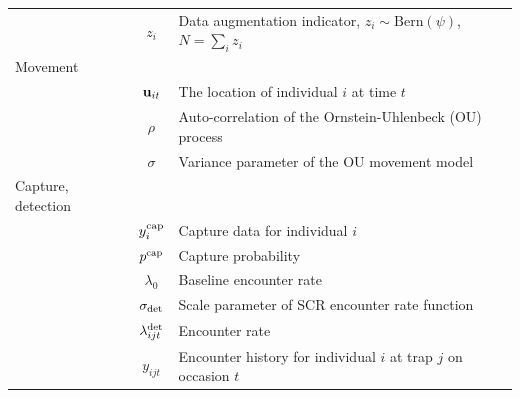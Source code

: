\documentclass[12pt]{article}
\newcommand{\buit}{{\bf u}_{it}}
\begin{document}
\begin{table}[h!]
\begin{tabular}{p{3.5cm}cp{11cm}}
                          & $z_i$               & Data augmentation indicator, $z_i \sim \mathrm{Bern}(\psi)$, $N=\sum_i z_i$                \\
    Movement              &                     &                                                                     \\
                          & $\buit$        & The location of individual $i$ at time $t$                          \\
                          & $\rho$              & Auto-correlation of the Ornstein-Uhlenbeck (OU) process \\
                          & $\sigma$ & Variance parameter of the OU movement model         \\
    Capture, detection &                     &                                                                     \\
                          & $y^{\rm cap}_i$      & Capture data for individual $i$ \\
                          & $p^{\rm cap}$        & Capture probability                                                 \\
                          & $\lambda_0$         & Baseline encounter rate                                             \\
                          & $\sigma_{\rm det}$  & Scale parameter of SCR encounter rate function                      \\
                          & $\lambda^{\rm det}_{ijt}$     & Encounter rate                                                      \\
                          & $y_{ijt}$           & Encounter history for individual $i$ at trap $j$ on occasion $t$ \\
    \hline
  \end{tabular}
  \label{tab:defs}
\end{table}

\clearpage
\end{document}

